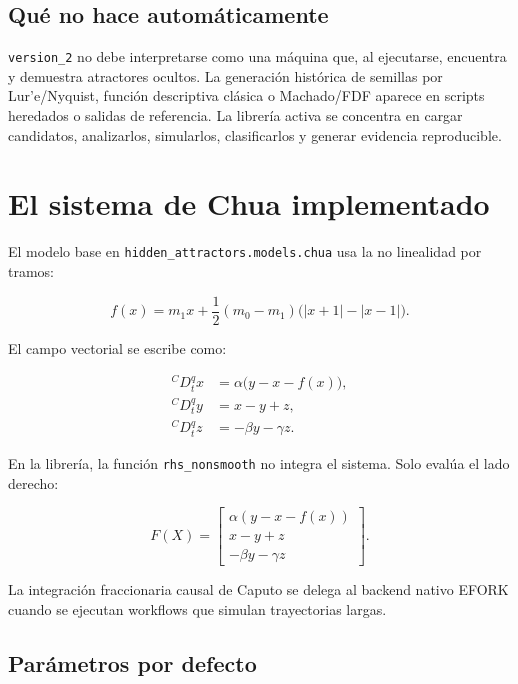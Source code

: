 \documentclass[11pt,letterpaper]{article}
\begin{document}
\subsection{Qué no hace automáticamente}

\begin{advertencia}
\texttt{version\_2} no debe interpretarse como una máquina que, al ejecutarse, encuentra y demuestra atractores ocultos. La generación histórica de semillas por Lur'e/Nyquist, función descriptiva clásica o Machado/FDF aparece en scripts heredados o salidas de referencia. La librería activa se concentra en cargar candidatos, analizarlos, simularlos, clasificarlos y generar evidencia reproducible.
\end{advertencia}

\section{El sistema de Chua implementado}

El modelo base en \texttt{hidden\_attractors.models.chua} usa la no linealidad por tramos:

\begin{equation}
 f(x)=m_1x+\frac{1}{2}(m_0-m_1)\bigl(|x+1|-|x-1|\bigr).
\end{equation}

El campo vectorial se escribe como:

\begin{align}
{}^C D_t^q x &= \alpha\bigl(y-x-f(x)\bigr),\\
{}^C D_t^q y &= x-y+z,\\
{}^C D_t^q z &= -\beta y-\gamma z.
\end{align}

En la librería, la función \texttt{rhs\_nonsmooth} no integra el sistema. Solo evalúa el lado derecho:

\begin{equation}
F(X)=
\begin{bmatrix}
\alpha(y-x-f(x))\\
x-y+z\\
-\beta y-\gamma z
\end{bmatrix}.
\end{equation}

La integración fraccionaria causal de Caputo se delega al backend nativo EFORK cuando se ejecutan workflows que simulan trayectorias largas.

\subsection{Parámetros por defecto}
\end{document}
